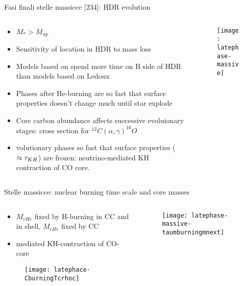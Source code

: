 \begin{frame}{Fasi finali stelle massicce [234]: HDR evolution}
\begin{columns}[T]
	\begin{column}{0.45\textwidth}
		\begin{itemize}
		\item $M_*>M_{up}$
		\item Sensitivity of location in HDR to mass loss
		\item Models based on \sch spend more time on B side of HDR than models based on Ledoux
		\item Phases after He-burning are so fast that surface properties doesn't change much until star explode
        \item Core carbon abundance affects successive evoluionary stages: cross section for $^{12}C(\alpha,\gamma)^{16}O$
        \item volutionary phases so fast that surface properties ($\approx\tau_{KH}{}$) are frozen: neutrino-mediated KH contraction of CO core.
    \end{itemize}
	\end{column}
	\begin{column}{0.50\textwidth}
		\begin{figure}[!ht]
			\texttt{[image: latephase-massive]}\label{fig:latephase-massive}
		\end{figure}
\end{column}\end{columns}
\end{frame}

\begin{frame}{Stelle massicce: nuclear burning time scale and core masses}
\begin{columns}[T]
	\begin{column}{0.5\textwidth}
		\begin{itemize}
		\item $M_{cHe}$ fixed by H-burning in CC and in shell, $M_{cHe}$ fixed by CC
		\item \Pnue mediated KH-contraction of CO-core
		\end{itemize}
	\begin{figure}[!ht]
	\texttt{[image: latephace-CburningTcrhoc]}\label{fig:latephace-CburningTcrhoc}
	\end{figure}
	\end{column}
	\begin{column}{0.4\textwidth}
		\begin{figure}[!ht]
			\texttt{[image: latephase-massive-taumburningmnext]}\label{fig:latephase-massive-taumburningmnext}
		\end{figure}
\end{column}\end{columns}
\end{frame}

